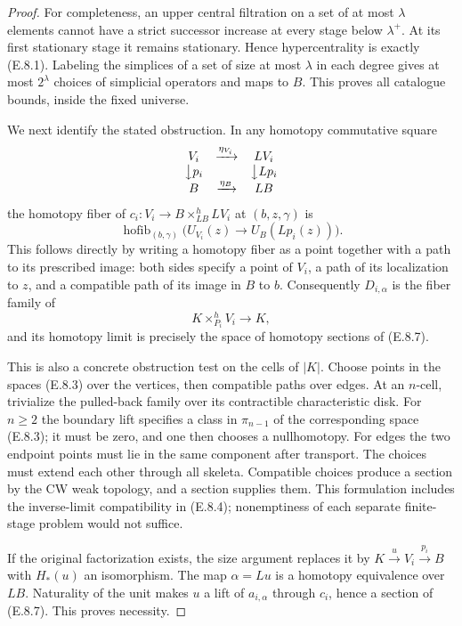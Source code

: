 \begin{proof}
For completeness, an upper central filtration on a set of at
most $\lambda$ elements cannot have a strict successor increase
at every stage below $\lambda^+$. At its first stationary stage
it remains stationary. Hence hypercentrality is exactly
(E.8.1). Labeling the simplices of a set of size at most
$\lambda$ in each degree gives at most $2^\lambda$ choices of
simplicial operators and maps to $B$. This proves all catalogue
bounds, inside the fixed universe.

We next identify the stated obstruction. In any homotopy
commutative square
\[
 \begin{array}{ccc}
 V_i&\xrightarrow{\eta_{V_i}}&LV_i\\
 \big\downarrow p_i&&\big\downarrow Lp_i\\
 B&\xrightarrow{\eta_B}&LB
 \end{array}
\]
the homotopy fiber of
$c_i:V_i\to B\times^h_{LB}LV_i$ at $(b,z,\gamma)$ is
\[
 \operatorname{hofib}_{(b,\gamma)}
       \bigl(U_{V_i}(z)\to U_B(Lp_i(z))\bigr).
\]
This follows directly by writing a homotopy fiber as a point
together with a path to its prescribed image: both sides specify
a point of $V_i$, a path of its localization to $z$, and a
compatible path of its image in $B$ to $b$.
Consequently $D_{i,\alpha}$ is the fiber family of
\[
                K\times^h_{P_i}V_i\longrightarrow K,
                                                               \tag{E.8.7}
\]
and its homotopy limit is precisely the space of homotopy sections
of (E.8.7).

This is also a concrete obstruction test on the cells of $|K|$.
Choose points in the spaces (E.8.3) over the vertices, then
compatible paths over edges. At an $n$-cell, trivialize the
pulled-back family over its contractible characteristic disk.
For $n\geq2$ the boundary lift specifies a class in
$\pi_{n-1}$ of the corresponding space (E.8.3); it must be zero,
and one then chooses a nullhomotopy. For edges the two endpoint
points must lie in the same component after transport.
The choices must extend each other through all skeleta.
Compatible choices produce a section by the CW weak topology,
and a section supplies them. This formulation includes the
inverse-limit compatibility in (E.8.4); nonemptiness of each
separate finite-stage problem would not suffice.

If the original factorization exists, the size argument replaces
it by $K\xrightarrow{u}V_i\xrightarrow{p_i}B$ with
$H_*(u)$ an isomorphism. The map $\alpha=Lu$ is a homotopy
equivalence over $LB$. Naturality of the unit makes $u$ a lift
of $a_{i,\alpha}$ through $c_i$, hence a section of (E.8.7).
This proves necessity.


\end{proof}
